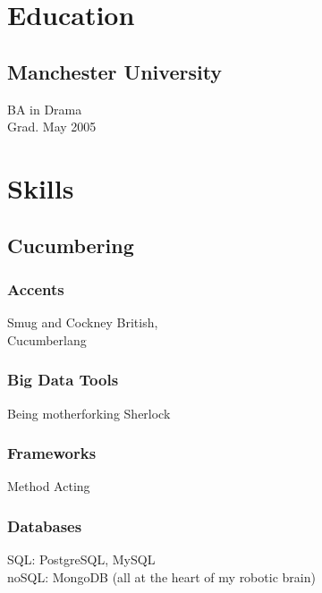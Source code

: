 \documentclass[]{two-column-resume}
\begin{document}
\begin{minipage}[t]{0.34\textwidth}

\section{Education}

\subsection{Manchester University}
BA in Drama\\
Grad. May 2005 \\
\sectionsep


\section{Skills}
\setlength{\parindent}{3ex}
\subsection{Cucumbering}
\subsubsection{Accents}
Smug and Cockney British,\\
Cucumberlang
\newline

\subsubsection{Big Data Tools}
Being motherforking Sherlock
\newline

\subsubsection{Frameworks}
Method Acting
\newline

\subsubsection{Databases}
SQL: PostgreSQL, MySQL\\
noSQL: MongoDB (all at the heart of my robotic brain)
\newline


\end{minipage}
\end{document}
